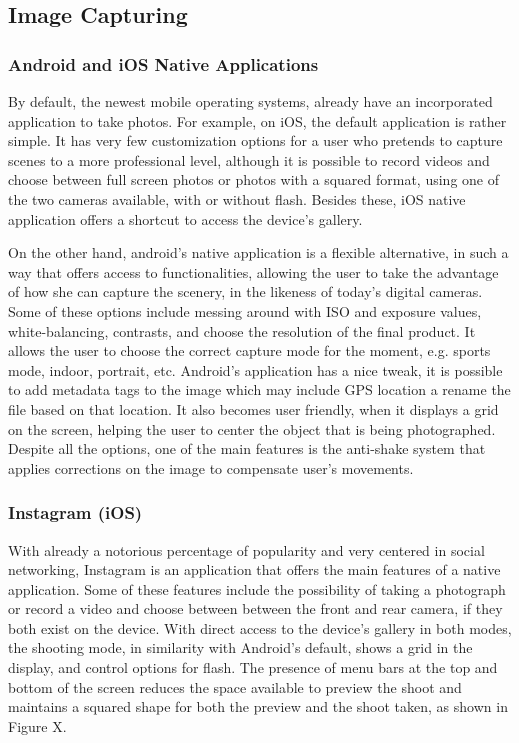 \subsection{Image Capturing}

\subsubsection{Android and iOS Native Applications}

 By default, the newest mobile operating systems, already have an incorporated application to take photos. For example, on iOS, the default application is rather simple. It has very few customization options for a user who pretends to capture scenes to a more professional level, although it is possible to record videos and choose between full screen photos or photos with a squared format, using one of the two cameras available, with or without flash. Besides these, iOS native application offers a shortcut to access the device’s gallery.

 On the other hand, android’s native application is a flexible alternative, in such a way that offers access to functionalities, allowing the user to take the advantage of how she can capture the scenery, in the likeness of today’s digital cameras.
Some of these options include messing around with ISO and exposure values, white-balancing, contrasts, and choose the resolution of the final product. It allows the user to choose the correct capture mode for the moment, e.g. sports mode, indoor, portrait, etc.
Android's application has a nice tweak, it is possible to add metadata tags to the image which may include GPS location a rename the file based on that location. It also becomes user friendly, when it displays a grid on the screen, helping the user to center the object that is being photographed. Despite all the options, one of the main features is the anti-shake system that applies corrections on the image to compensate user’s movements.

\subsubsection{Instagram (iOS)}

 With already a notorious percentage of popularity and very centered in social networking, Instagram is an application that offers the main features of a native application. Some of these features include the possibility of taking a photograph or record a video and choose between between the front and rear camera, if they both exist on the device. With direct access to the device’s gallery in both modes, the shooting mode, in similarity with Android’s default, shows a grid in the display, and control options for flash.
The presence of menu bars at the top and bottom of the screen reduces the space available to preview the shoot and maintains a squared shape for both the preview and the shoot taken, as shown in Figure X.


